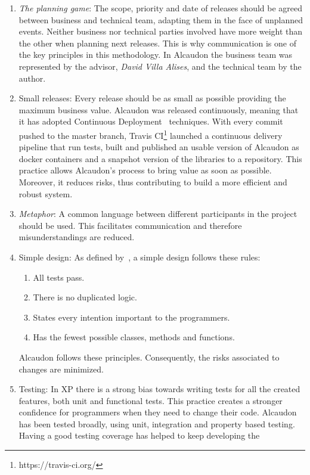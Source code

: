 \begin{enumerate}
\item \textit{The planning game}: The scope, priority and date of releases
  should be agreed between business and technical team, adapting them in the
  face of unplanned events. Neither business nor technical parties involved have
  more weight than the other when planning next releases. This is why
  communication is one of the key principles in this methodology. In Alcaudon
  the business team was represented by the advisor, \textit{David Villa Alises},
  and the technical team by the author.
\item Small releases: Every release should be as small as possible providing the
  maximum business value. Alcaudon was released continuously, meaning that it
  has adopted Continuous Deployment~\cite{cd} techniques. With every commit
  pushed to the master branch, Travis CI\footnote{https://travis-ci.org/}
  launched a continuous delivery pipeline that run tests, built and published
  an usable version of Alcaudon as docker containers and a snapshot version of
  the libraries to a repository. This practice allows Alcaudon's process to
  bring value as soon as possible. Moreover, it reduces risks, thus contributing
  to build a more efficient and robust system.
\item \textit{Metaphor}: A common language between different participants in the
  project should be used. This facilitates communication and therefore
  misunderstandings are reduced.
\item Simple design: As defined by~\cite{xp}, a simple design follows these rules:
  \begin{enumerate}
  \item All tests pass.
  \item There is no duplicated logic.
  \item States every intention important to the programmers.
  \item Has the fewest possible classes, methods and functions.
  \end{enumerate}
  Alcaudon follows these principles. Consequently, the risks associated to
  changes are minimized.
\item Testing: In \acs{XP} there is a strong bias towards writing tests for all the
  created features, both unit and functional tests. This practice creates
  a stronger confidence for programmers when they need to change their code.
  Alcaudon has been tested broadly, using unit, integration and property based
  testing. Having a good testing coverage has helped to keep developing the

\end{enumerate}
